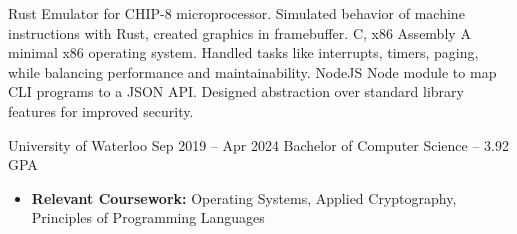 \documentclass{article}
\begin{document}
\normalsize
{}
{Rust}
{Emulator for CHIP-8 microprocessor. Simulated behavior of machine instructions with
Rust, created graphics in framebuffer.}
\vspace{1.5mm}
{C, x86 Assembly}
{A minimal x86 operating system. Handled tasks like interrupts, timers,
paging, while balancing performance and maintainability.}
\vspace{1.5mm}
{NodeJS}
{Node module to map CLI programs to a JSON API. Designed abstraction over standard
library features for improved security.}
\vspace{1mm}

\EducationEntry
{University of Waterloo}
{Sep 2019 -- Apr 2024}
{Bachelor of Computer Science -- 3.92 GPA}
{\begin{itemize} \itemsep -1pt
    \item {\bf Relevant Coursework:} Operating Systems, Applied Cryptography, Principles of Programming Languages
    \end{itemize}}
\vspace{-2mm}
\end{document}
